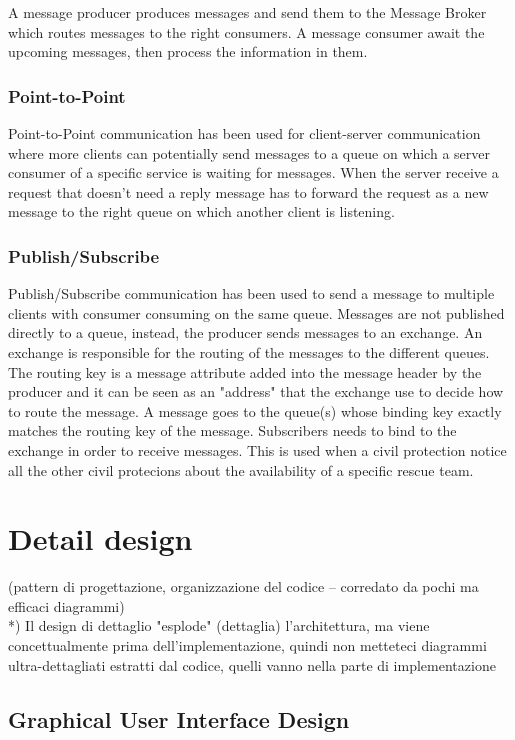 \documentclass[a4paper,12pt]{report}
\begin{document}
A message producer produces messages and send them to the Message Broker which
routes messages to the right consumers. A message consumer await the upcoming messages, then process the information in them.

\subsection{Point-to-Point}
Point-to-Point communication has been used for client-server communication where more clients can potentially send messages to a queue on which a server consumer of a specific service is waiting for messages.
When the server receive a request that doesn't need a reply message has to forward the request as a new message to the right queue on which another client is listening.

\subsection{Publish/Subscribe}
Publish/Subscribe communication has been used to send a message to multiple clients with consumer consuming on the same queue. 
Messages are not published directly to a queue, instead, the producer sends messages to an exchange.
An exchange is responsible for the routing of the messages to the different queues. 
The routing key is a message attribute added into the message header by the producer and it can be seen as an "address" that the exchange use to decide how to route the message. 
A message goes to the queue(s) whose binding key exactly matches the routing key of the message.
Subscribers needs to bind to the exchange in order to receive messages.
This is used when a civil protection notice all the other civil protecions about the availability of a specific rescue team.


\chapter{Detail design}
(pattern di progettazione, organizzazione del codice -- corredato da pochi ma efficaci diagrammi)\\
*) Il design di dettaglio "esplode" (dettaglia) l'architettura, ma viene concettualmente prima dell'implementazione, quindi non metteteci diagrammi ultra-dettagliati estratti dal codice, quelli vanno nella parte di implementazione

\section{Graphical User Interface Design}
\end{document}

